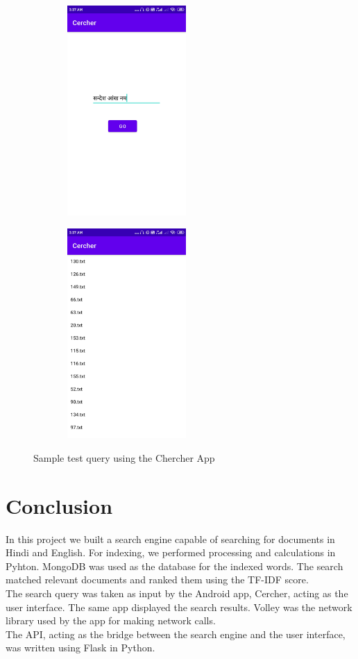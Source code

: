 \documentclass[12pt]{article}
\begin{document}
	\begin{figure}
		\begin{subfigure}{0.45\textwidth}
			\centering
			\includegraphics[width=5cm,height=8cm]{query1.jpeg}
		\end{subfigure}
		\hfill
		\begin{subfigure}{0.45\textwidth}
			\centering
			\includegraphics[width=5cm,height=8cm]{result1.jpeg}
		\end{subfigure}
		\caption{Sample test query using the Chercher App}
	\end{figure}
	
	\pagebreak
	\section{Conclusion}
	
	In this project we built a search engine capable of searching for documents in Hindi and English. For indexing, we performed processing and calculations in Pyhton. MongoDB was used as the database for the indexed words. The search matched relevant documents and ranked them using the TF-IDF score. \\
	
	The search query was taken as input by the Android app, Cercher, acting as the user interface. The same app displayed the search results. Volley was the network library used by the app for making network calls.\\
	
	The API, acting as the bridge between the search engine and the user interface, was written using Flask in Python.\\
	
	\newpage
	
	
	
\end{document}
